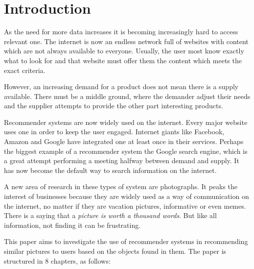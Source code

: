 \chapter*{Introduction}

As the need for more data increases it is becoming increasingly hard to access relevant one. The internet is now an endless network full of websites with content which are not always available to everyone. Usually, the user most know exactly what to look for and that website must offer them the content which meets the exact criteria.

However, an increasing demand for a product does not mean there is a supply available. There must be a middle ground, where the demander adjust their needs and the supplier attempts to provide the other part interesting products.

Recommender systems are now widely used on the internet. Every major website uses one in order to keep the user engaged. Internet giants like Facebook, Amazon and Google have integrated one at least once in their services. Perhaps the biggest example of a recommender system the Google search engine, which is a great attempt performing a meeting halfway between demand and supply. It has now become the default way to search information on the internet.

A new area of research in these types of system are photographs. It peaks the interest of businesses because they are widely used as a way of communication on the internet, no matter if they are vacation pictures, informative or even memes. There is a saying that a \textit{picture is worth a thousand words}. But like all information, not finding it can be frustrating.

This paper aims to investigate the use of recommender systems in recommending similar pictures to users based on the objects found in them. The paper is structured in 8 chapters, as follows:

